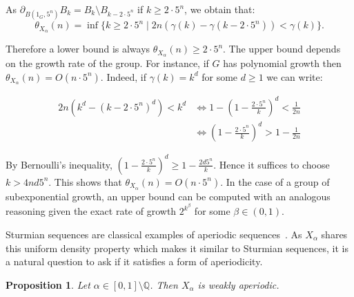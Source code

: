 \documentclass[letterpaper]{article}
\theoremstyle{plain}
\newtheorem{proposition}[theorem]{Proposition}
\begin{document}
	 As $\partial_{B(1_G,5^n)}B_k = B_k \setminus B_{k-2\cdot5^n}$ if $k \geq 2\cdot 5^n$, we obtain that: $$\theta_{X_{\alpha}}(n) = \inf\{ k \geq 2\cdot 5^n \mid 2n(\gamma(k)-\gamma(k-2\cdot 5^n)) < \gamma(k) \}.$$
	 
	 Therefore a lower bound is always $\theta_{X_{\alpha}}(n) \geq 2\cdot 5^n$. The upper bound depends on the growth rate of the group. For instance, if $G$ has polynomial growth then $\theta_{X_{\alpha}}(n) = O(n\cdot 5^n).$ Indeed, if $\gamma(k) = k^d$ for some $d \geq 1$ we can write: 
	 
	 \begin{align*}
	 2n(k^d-(k-2\cdot 5^n)^d) < k^d & \iff 1-( 1- \frac{2\cdot 5^n}{k} )^d < \frac{1}{2n}\\ & \iff ( 1- \frac{2\cdot 5^n}{k} )^d > 1-\frac{1}{2n}
	 \end{align*}
	 
	 By Bernoulli's inequality, $( 1- \frac{2\cdot 5^n}{k} )^d \geq 1 - \frac{2d 5^n}{k}$. Hence it suffices to choose $k > 4nd5^n$. This shows that $\theta_{X_{\alpha}}(n) = O(n\cdot 5^n)$. In the case of a group of subexponential growth, an upper bound can be computed with an analogous reasoning given the exact rate of growth $2^{k^{\beta}}$ for some $\beta \in (0,1)$.	

	Sturmian sequences are classical examples of aperiodic sequences~\cite{fogg2002substitutions}. As $X_{\alpha}$ shares this uniform density property which makes it similar to Sturmian sequences, it is a natural question to ask if it satisfies a form of aperiodicity.
	
	\begin{proposition}
		\label{proposition.X_alpha_weakly_aperiodic}
		Let $\alpha \in [0,1]\setminus \mathbb{Q}$. Then $X_{\alpha}$ is weakly aperiodic.
	\end{proposition}
	
\end{document}
